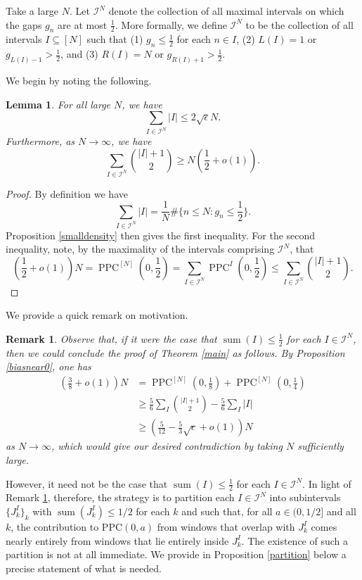 \documentclass[12pt]{amsart}
\newtheorem{lemma}[proposition]{Lemma}
\newtheorem{remark}[proposition]{Remark}
\theoremstyle{definition}
\newcommand{\vs}{\vspace{3mm}}
\newcommand{\mc}{\mathcal}
\newcommand{\sub}{\subseteq}
\DeclareMathOperator{\PPC}{PPC}
\DeclareMathOperator{\summ}{sum}
\begin{document}
\vspace{1mm}

Take a large $N$. Let $\mc{I}^N$ denote the collection of all maximal intervals on which the gaps $g_n$ are at most $\frac{1}{2}$. More formally, we define $\mc{I}^N$ to be the collection of all intervals $I \sub [N]$ such that (1) $g_n \le \frac{1}{2}$ for each $n \in I$, (2) $L(I) = 1$ or $g_{L(I)-1} > \frac{1}{2}$, and (3) $R(I) = N$ or $g_{R(I)+1} > \frac{1}{2}$.

\vs

We begin by noting the following. 

\begin{lemma} \label{Ibounds}
For all large $N$, we have 
\[\sum_{I \in \mc I^N} |I| \leq 2 \sqrt{\epsilon} N.\]
Furthermore, as $N \to \infty$, we have
\[ \sum_{I \in \mc I^N} \binom{|I|+1}{2} \geq N(\frac{1}{2}+o(1)).\]
\end{lemma} 
\begin{proof}
By definition we have $$\sum_{I \in \mc I^N} |I| = \frac{1}{N} \# \{n \leq N : g_n \leq \frac{1}{2}\}.$$ Proposition \ref{smalldensity} then gives the first inequality. For the second inequality, note, by the maximality of the intervals comprising $\mc{I}^N$, that
\[ (\frac{1}{2} +o(1))N = \PPC^{[N]}(0,\frac{1}{2}) = \sum_{I \in \mc{I}^N}\PPC^I(0,\frac{1}{2}) \leq \sum_{I \in \mc{I}^N} \binom{|I|+1}{2}.\] 
\end{proof}


We provide a quick remark on motivation. 

\begin{remark}\label{remarker}
Observe that, if it were the case that $\summ(I) \le \frac{1}{2}$ for each $I \in \mc{I}^N$, then we could conclude the proof of Theorem \ref{main} as follows. By Proposition \ref{biasnear0}, one has 
\begin{align*}
(\frac{3}{8} + o(1))N &= \PPC^{[N]}(0,\frac{1}{8}) + \PPC^{[N]}(0,\frac{1}{4}) \\ &\geq \frac{5}{6}\sum_I \binom{|I|+1}{2} - \frac{5}{6}\sum_I |I| \\ &\geq   (\frac{5}{12} - \frac{5}{3}\sqrt \epsilon+o(1))N
\end{align*}
as $N \to \infty$, which would give our desired contradiction by taking $N$ sufficiently large. 
\end{remark}

However, it need not be the case that $\summ(I) \le \frac{1}{2}$ for each $I \in \mc{I}^N$. In light of Remark \ref{remarker}, therefore, the strategy is to partition each $I \in \mc{I}^N$ into subintervals $\{J_k^I\}_k$ with $\summ(J_k^I) \leq 1/2$ for each $k$ and such that, for all $a\in(0,1/2]$ and all $k$, the contribution to PPC$(0,a)$ from windows that overlap with $J_k^I$ comes nearly entirely from windows that lie entirely inside $J_k^I$. The existence of such a partition is not at all immediate. We provide in Proposition \ref{partition} below a precise statement of what is needed. 
\end{document}
